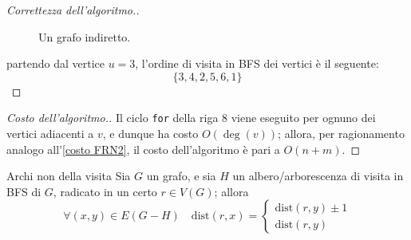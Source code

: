 \documentclass[a4paper, 12pt]{report}
\begin{document}
\begin{proof}[Correttezza dell'algoritmo.]
\begin{figure}[H]
            \caption{Un grafo indiretto.}
        \end{figure}

        partendo dal vertice $u = 3$, l'ordine di visita in BFS dei vertici è il seguente: $$\{3, 4, 2, 5, 6, 1\}$$

    \end{proof}

    \begin{proof}[Costo dell'algoritmo.]
        Il ciclo \texttt{for} della riga $8$ viene eseguito per ognuno dei vertici adiacenti a $v$, e dunque ha costo $O(\deg(v))$; allora, per ragionamento analogo all'\cref{costo FRN2}, il costo dell'algoritmo è pari a $O(n +m)$.
    \end{proof}

    \begin{framedobs}{Archi non della visita}
        Sia $G$ un grafo, e sia $H$ un albero/arborescenza di visita in BFS di $G$, radicato in un certo $r \in V(G)$; allora $$\forall (x, y) \in E(G - H) \quad \mathrm{dist}(r, x) = \left \{ \begin{array}{l} \mathrm{dist}(r, y) \pm 1 \\ \mathrm{dist}(r, y) \end{array} \right.$$
    \end{framedobs}
\end{document}
